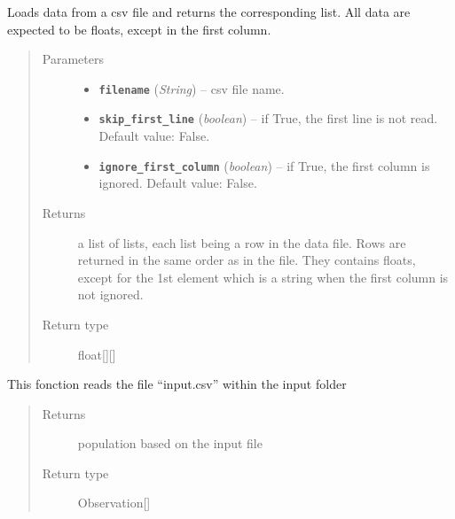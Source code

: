 \documentclass[letterpaper,10pt,english]{sphinxmanual}
\begin{document}
\begin{fulllineitems}
\label{data:es.read_data}
Loads data from a csv file and returns the corresponding list.
All data are expected to be floats, except in the first column.
\begin{quote}\begin{description}
\item[{Parameters}] \leavevmode\begin{itemize}
\item {} 
\textbf{\texttt{filename}} (\emph{String}) -- csv file name.

\item {} 
\textbf{\texttt{skip\_first\_line}} (\emph{boolean}) -- if True, the first line is not read.
Default value: False.

\item {} 
\textbf{\texttt{ignore\_first\_column}} (\emph{boolean}) -- if True, the first column is ignored.
Default value: False.

\end{itemize}

\item[{Returns}] \leavevmode
a list of lists, each list being a row in the data file.
Rows are returned in the same order as in the file.
They contains floats, except for the 1st element which is a string
when the first column is not ignored.

\item[{Return type}] \leavevmode
float{[}{]}{[}{]}

\end{description}\end{quote}

\end{fulllineitems}


\begin{fulllineitems}
\label{data:es.read_kmeans_input}
This fonction reads the file ``input.csv'' within the input folder
\begin{quote}\begin{description}
\item[{Returns}] \leavevmode
population based on the input file

\item[{Return type}] \leavevmode
Observation{[}{]}

\end{description}\end{quote}

\end{fulllineitems}
\end{document}
